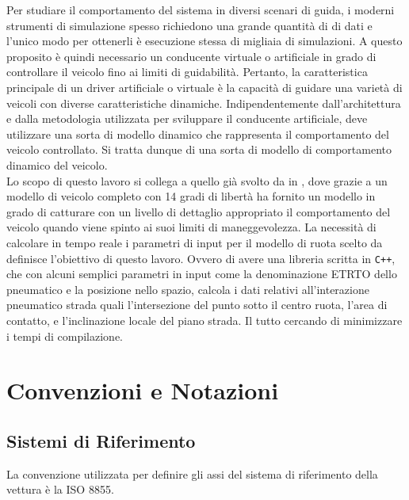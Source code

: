 Per studiare il comportamento del sistema in diversi scenari di guida, i moderni strumenti di simulazione spesso richiedono una grande quantità di di dati e l'unico modo per ottenerli è esecuzione stessa di migliaia di simulazioni. A questo proposito è quindi necessario un conducente virtuale o artificiale in grado di controllare il veicolo fino ai limiti di guidabilità. Pertanto, la caratteristica principale di un driver artificiale o virtuale è la capacità di guidare una varietà di veicoli con diverse caratteristiche dinamiche. Indipendentemente dall'architettura e dalla metodologia utilizzata per sviluppare il conducente artificiale, deve utilizzare una sorta di modello dinamico che rappresenta il comportamento del veicolo controllato. Si tratta dunque di una sorta di modello di comportamento dinamico del veicolo.\\
Lo scopo di questo lavoro si collega a quello già svolto da \citeauthor{Larcher} in \cite{Larcher}, dove grazie a un modello di veicolo completo con 14 gradi di libertà ha fornito un modello in grado di catturare con un livello di dettaglio appropriato il comportamento del veicolo quando viene spinto ai suoi limiti di maneggevolezza. La necessità di calcolare in tempo reale i parametri di input per il modello di ruota scelto da \cite{Larcher} definisce l'obiettivo di questo lavoro. Ovvero di avere una libreria scritta in \texttt{C++}, che con alcuni semplici parametri in input come la denominazione \ac{ETRTO} dello pneumatico e la posizione nello spazio, calcola i dati relativi all'interazione pneumatico strada quali l'intersezione del punto sotto il centro ruota, l'area di contatto, e l'inclinazione locale del piano strada. Il tutto cercando di minimizzare i tempi di compilazione.
%
\section{Convenzioni e Notazioni}
\label{Notazioni}
%
\subsection{Sistemi di Riferimento}
La convenzione utilizzata per definire gli assi del sistema di riferimento della vettura è la \ac{ISO} 8855.

